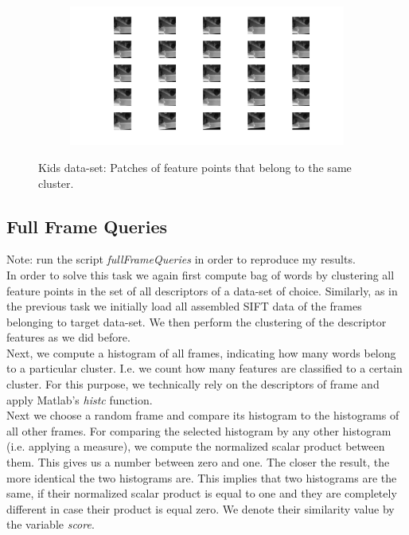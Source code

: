 \documentclass{paper}
\begin{document}
\begin{figure}[H]
\centering
\begin{subfigure}{1.0\textwidth}
\includegraphics[width=\textwidth]{figures/vocabulary/kids/voca1302}
\end{subfigure}
\caption{Kids data-set: Patches of feature points that belong to the same cluster.}
\label{fig:kids_word_2}
\end{figure}

\subsection{Full Frame Queries}
Note: run the script \emph{fullFrameQueries} in order to reproduce my results. \\

In order to solve this task we again first compute bag of words by clustering all feature points in the set of all descriptors of a data-set of choice. Similarly, as in the previous task we initially load all assembled SIFT data of the frames belonging to target data-set. We then perform the clustering of the descriptor features as we did before. \\

Next, we compute a histogram of all frames, indicating how many words belong to a particular cluster. I.e. we count how many features are classified to a certain cluster. For this purpose, we technically rely on the descriptors of frame and apply Matlab's \emph{histc} function. \\

Next we choose a random frame and compare its histogram to the histograms of all other frames. For comparing the selected histogram by any other histogram (i.e. applying a measure), we compute the normalized scalar product between them. This gives us a number between zero and one. The closer the result, the more identical the two histograms are. This implies that two histograms are the same, if their normalized scalar product is equal to one and they are completely different in case their product is equal zero. We denote their similarity value by the variable \emph{score}. \\
\end{document}
